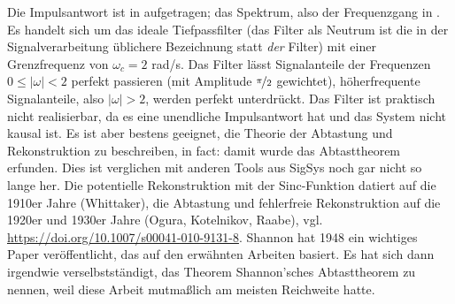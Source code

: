 \begin{Ansatz}
Die Impulsantwort ist in  aufgetragen;
das Spektrum, also der Frequenzgang in .
Es handelt sich um das ideale Tiefpassfilter (das Filter als Neutrum ist die in der
Signalverarbeitung üblichere Bezeichnung statt \textit{der} Filter)
mit einer Grenzfrequenz von $\omega_c=2$ rad/s.
Das Filter lässt Signalanteile der Frequenzen $0\leq |\omega|<2$ perfekt passieren
(mit Amplitude $\nicefrac{\pi}{2}$ gewichtet), höherfrequente
Signalanteile, also $|\omega|>2$, werden perfekt unterdrückt.
Das Filter ist praktisch nicht realisierbar, da es eine unendliche Impulsantwort hat
und das System nicht kausal ist.
Es ist aber bestens geeignet, die Theorie der Abtastung und Rekonstruktion
zu beschreiben, in fact: damit wurde das Abtasttheorem erfunden. Dies ist verglichen
mit anderen Tools aus SigSys noch gar nicht so lange her. Die potentielle
Rekonstruktion mit der Sinc-Funktion datiert auf die 1910er Jahre (Whittaker),
die Abtastung und fehlerfreie Rekonstruktion auf die 1920er und 1930er Jahre (Ogura, Kotelnikov, Raabe), vgl. \url{https://doi.org/10.1007/s00041-010-9131-8}.
Shannon hat 1948 ein wichtiges Paper veröffentlicht, das auf den erwähnten Arbeiten basiert.
Es hat sich dann irgendwie verselbstständigt, das Theorem Shannon'sches Abtasttheorem zu nennen, weil
diese Arbeit mutmaßlich am meisten Reichweite hatte.
\end{Ansatz}
